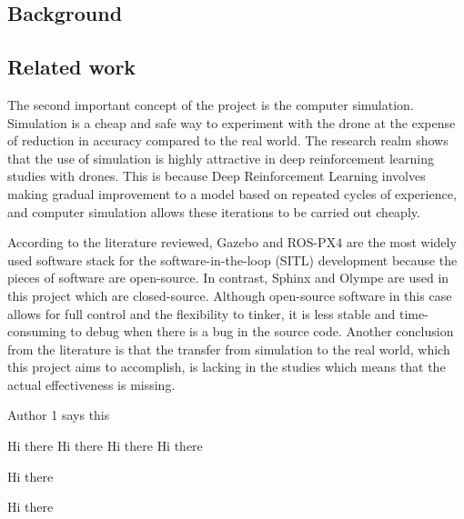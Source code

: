 \documentclass[../main.tex]{subfiles}
\begin{document}
\subsection{Background}

\blindtext

\subsection{Related work}



The second important concept of the project is the computer simulation.
Simulation is a cheap and safe way to experiment with the drone
at the expense of reduction in accuracy compared to the real world.
The research realm shows that the use of simulation is highly attractive
in deep reinforcement learning studies with drones.
This is because Deep Reinforcement Learning involves
making gradual improvement to a model based on 
repeated cycles of experience, and computer simulation 
allows these iterations to be carried out cheaply.

According to the literature reviewed, 
Gazebo and ROS-PX4 are the most widely used software stack 
for the software-in-the-loop (\textsc{SITL}) development
because the pieces of software are open-source. 
In contrast, Sphinx and Olympe are used in this project 
which are closed-source.
Although open-source software in this case 
allows for full control and the flexibility to tinker,
it is less stable and time-consuming to debug
when there is a bug in the source code.
Another conclusion from the literature is that 
the transfer from simulation to the real world,
which this project aims to accomplish,
is lacking in the studies 
which means that the actual effectiveness is missing.


Author 1 says this

Hi there \cite{Zho20}
Hi there \textcite{Zho20}
Hi there \parencite{Zho20}
Hi there \citeauthor{Zho20}

Hi there \cite{Wal19}

Hi there \cite{Gar20}



\blindtext
\end{document}
